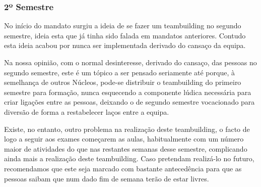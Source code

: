 
\subsubsection{2º Semestre}

No início do mandato surgiu a ideia de se fazer um teambuilding no segundo semestre, ideia esta que já tinha sido falada em mandatos anteriores. Contudo esta ideia acabou por nunca ser implementada derivado do cansaço da equipa.

Na nossa opinião, com o normal desinteresse, derivado do cansaço, das pessoas no segundo semestre, este é um tópico a ser pensado seriamente até porque, à semelhança de outros Núcleos, pode-se distribuir o teambuilding do primeiro semestre para formação, nunca esquecendo a componente lúdica necessária para criar ligações entre as pessoas, deixando o de segundo semestre vocacionado para diversão de forma a restabelecer laços entre a equipa.

Existe, no entanto, outro problema na realização deste teambuilding, o facto de logo a seguir aos exames começarem as aulas, habitualmente com um número maior de atividades do que nas restantes semanas desse semestre, complicando ainda mais a realização deste teambuilding. Caso pretendam realizá-lo no futuro, recomendamos que este seja marcado com bastante antecedência para que as pessoas saibam que num dado fim de semana terão de estar livres.